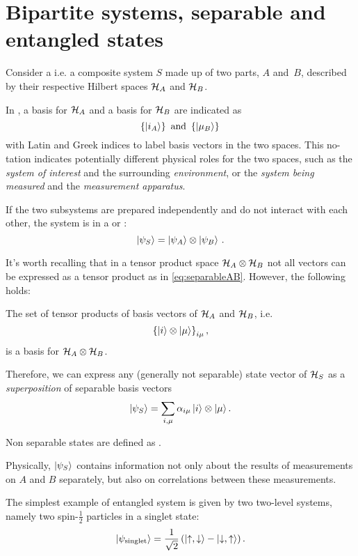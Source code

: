 \section{Bipartite systems, separable and entangled states}

Consider a 
i.e. a composite system $S$
made up of two parts, $A$ and~$B$,
described by their respective Hilbert spaces
$\mathcal{H}_A$ and $\mathcal{H}_B$.

In \cite{Haroche_Exploring},
a basis for $\mathcal{H}_A$ and a basis for $\mathcal{H}_B$
are indicated as
$$
  \left\{\ket{i_A}\right\} \text{ and } \left\{\ket{\mu_B}\right\}\,
$$
with Latin and Greek indices to label basis vectors in the two spaces.
This no-\\tation %
in\-di\-cates potentially different physical roles for the two spaces,
such as the \emph{system of interest} and the surrounding \emph{environment},
or the \emph{system being measured} and the \emph{measurement apparatus}.

If the two subsystems are prepared independently and do not interact with each other,
the system is in a  or :
\begin{equation}\label{eq:separableAB}
  \ket{\psi_S} = \ket{\psi_A}\otimes\ket{\psi_B} \,\text{.}
\end{equation}

It's worth recalling that in a tensor product space $\mathcal{H}_A\otimes\mathcal{H}_B$
not all vectors can be expressed as a tensor product as in \eqref{eq:separableAB}.
However, the following holds:

\begin{proposition}\label{TensorBase}
The set of tensor products of basis vectors of $\mathcal{H}_A$ and $\mathcal{H}_B$,
i.e. $$\left\{\ket{i} \otimes \ket{\mu}\right\}_{i\mu},$$
is a basis for $\mathcal{H}_A \otimes \mathcal{H}_B$.
\end{proposition}
Therefore, we can express any
(generally not separable) state vector of $\mathcal{H}_S$
as a \emph{superposition} of separable basis vectors
\begin{equation}\label{eq:bipartite_expansion}
  \ket{\psi_S} = \sum_{i, \mu}\alpha_{i\mu}\ket{i}\otimes\ket{\mu} \text{.}
\end{equation}

\begin{definition}
  Non separable states are defined as .
\end{definition}

Physically,
$\ket{\psi_S}$ contains information
not only about the results of measurements on $A$ and $B$ separately,
but also on correlations between these measurements.

The simplest example of entangled system is given by two two-level systems,
namely two spin-$\frac{1}{2}$ particles in a singlet state:
\[
  \ket{\psi_{\text{singlet}}} = \frac{1}{\sqrt{2}} \left(\ket{\uparrow, \downarrow} - \ket{\downarrow, \uparrow}\right).
\]
